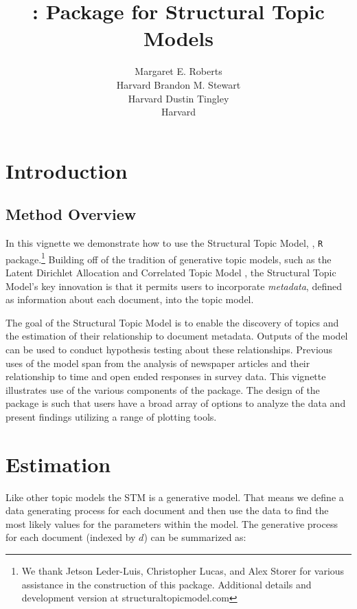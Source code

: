 \documentclass[nojss]{jss}
\author{\hspace{1.1in}Margaret E. Roberts\\\hspace{1.1in}Harvard \And
  \hspace{1.5in}Brandon M. Stewart\\\hspace{1.5in}Harvard \And
  \hspace{1.5in}Dustin Tingley\\\hspace{1.5in}Harvard \And
}
\title{\pkg{stm}: \proglang{R} Package for Structural Topic Models}
\newcommand\spacingset[1]{\renewcommand{\baselinestretch}{#1}\small\normalsize}
\begin{document}

\spacingset{1.5}

\section{Introduction}
\subsection{Method Overview}

In this vignette we demonstrate how to use the Structural Topic Model, , \texttt{R} package.\footnote{We thank Jetson Leder-Luis, Christopher Lucas, and Alex Storer for various assistance in the construction of this package.  Additional details and development version at structuraltopicmodel.com} Building off of the tradition of generative topic models, such as the Latent Dirichlet Allocation \citep{blei2003latent} and Correlated Topic Model \citep{blei2007correlated}, the Structural Topic Model's key innovation is that it permits users to incorporate \emph{metadata}, defined as information about each document, into the topic model.

The goal of the Structural Topic Model is to enable the discovery of topics and the estimation of their relationship to document metadata. Outputs of the model can be used to conduct hypothesis testing about these relationships. Previous uses of the model span from the analysis of newspaper articles and their relationship to time and open ended responses in survey data. This vignette illustrates use of the various components of the package. The design of the package is such that users have a broad array of options to analyze the data and present findings utilizing a range of plotting tools.

\section{Estimation}
Like other topic models the STM is a generative model. That means we define a data generating process for each document and then use the data to find the most likely values for the parameters within the model.  The generative process for each document (indexed by $d$) can be summarized as:
\end{document}
